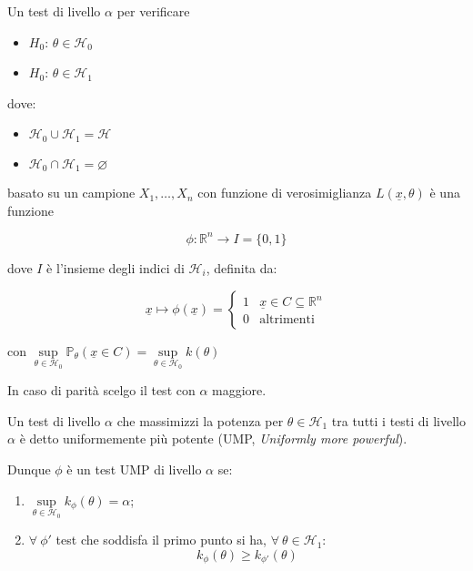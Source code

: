 \documentclass[hidelinks, 10pt]{report}
\begin{document}
\begin{defn}
Un test di livello $ \alpha $ per verificare
\begin{itemize}
\item $ H_0 $: $ \theta \in \mathcal{H}_{0} $
\item $ H_0 $: $ \theta \in \mathcal{H}_{1} $
\end{itemize}

dove:
\begin{itemize}
\item $ \mathcal{H}_{0} \cup \mathcal{H}_{1} = \mathcal{H} $
\item $ \mathcal{H}_{0} \cap \mathcal{H}_{1}  = \varnothing $
\end{itemize}

basato su un campione $ X_{1}, \dotsc, X_{n} $ con funzione di verosimiglianza $ L(\underline{x}, \theta) $ \`e una funzione

\[ \phi: \mathbb{R}^{n} \to I = \{ 0, 1 \} \]

dove $ I $ \`e l'insieme degli indici di $ \mathcal{H}_{i} $, definita da:

\[ \underline{x} \mapsto \phi(\underline{x}) = \begin{cases} 1 & \underline{x} \in C \subseteq \mathbb{R}^{n} \\ 0 & \text{altrimenti} \end{cases} \]

con $ \sup\limits_{\theta \in \mathcal{H}_{0}} \mathbb{P}_{\theta} (\underline{x} \in C) = \sup\limits_{\theta \in \mathcal{H}_{0}} k(\theta) $
\end{defn}

In caso di parit\`a scelgo il test con $ \alpha $ maggiore.

\begin{defn}
Un test di livello $ \alpha $ che massimizzi la potenza per $ \theta \in \mathcal{H}_{1} $ tra tutti i testi di livello $ \alpha $ \`e detto uniformemente pi\`u potente (UMP, \emph{Uniformly more powerful}).
\end{defn}

Dunque $ \phi $ \`e un test UMP di livello $ \alpha $ se:
\begin{enumerate}
\item $ \sup\limits_{\theta \in \mathcal{H}_{0}} k_{\phi} (\theta) = \alpha $;
\item $ \forall\ \phi' $ test che soddisfa il primo punto si ha, $ \forall\ \theta \in \mathcal{H}_{1} $:
\[ k_{\phi} (\theta) \ge k_{\phi'} (\theta) \] 
\end{enumerate}
\end{document}
